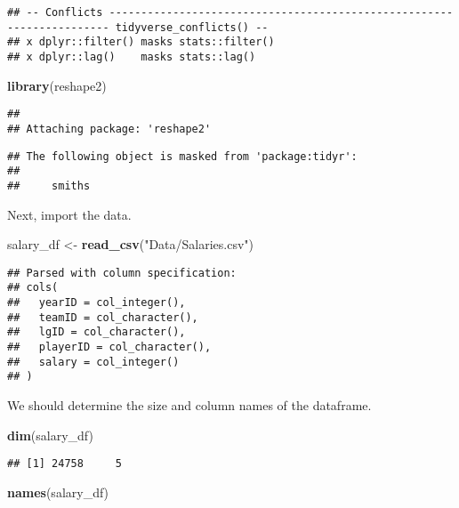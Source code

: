 \documentclass[]{article}
\newenvironment{Shaded}{\begin{snugshade}}{\end{snugshade}}
\newcommand{\KeywordTok}[1]{\textcolor[rgb]{0.13,0.29,0.53}{\textbf{#1}}}
\newcommand{\StringTok}[1]{\textcolor[rgb]{0.31,0.60,0.02}{#1}}
\newcommand{\NormalTok}[1]{#1}
\begin{document}
\begin{verbatim}
## -- Conflicts ---------------------------------------------------------------------- tidyverse_conflicts() --
## x dplyr::filter() masks stats::filter()
## x dplyr::lag()    masks stats::lag()
\end{verbatim}

\begin{Shaded}
\begin{Highlighting}[]
\KeywordTok{library}\NormalTok{(reshape2)}
\end{Highlighting}
\end{Shaded}

\begin{verbatim}
## 
## Attaching package: 'reshape2'
\end{verbatim}

\begin{verbatim}
## The following object is masked from 'package:tidyr':
## 
##     smiths
\end{verbatim}

Next, import the data.

\begin{Shaded}
\begin{Highlighting}[]
\NormalTok{salary_df <-}\StringTok{ }\KeywordTok{read_csv}\NormalTok{(}\StringTok{"Data/Salaries.csv"}\NormalTok{)}
\end{Highlighting}
\end{Shaded}

\begin{verbatim}
## Parsed with column specification:
## cols(
##   yearID = col_integer(),
##   teamID = col_character(),
##   lgID = col_character(),
##   playerID = col_character(),
##   salary = col_integer()
## )
\end{verbatim}

We should determine the size and column names of the dataframe.

\begin{Shaded}
\begin{Highlighting}[]
\KeywordTok{dim}\NormalTok{(salary_df)}
\end{Highlighting}
\end{Shaded}

\begin{verbatim}
## [1] 24758     5
\end{verbatim}

\begin{Shaded}
\begin{Highlighting}[]
\KeywordTok{names}\NormalTok{(salary_df)}
\end{Highlighting}
\end{Shaded}
\end{document}
